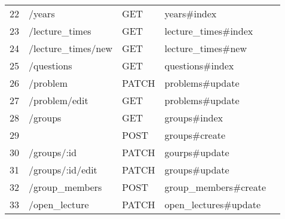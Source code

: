 \begin{table}[]
\begin{tabular}{lllll}
\multicolumn{1}{|l|}{22}  & \multicolumn{1}{l|}{/years}              & \multicolumn{1}{l|}{GET}    & \multicolumn{1}{l|}{years\#index}             &  \\ \cline{1-4}
\multicolumn{1}{|l|}{23}  & \multicolumn{1}{l|}{/lecture\_times}     & \multicolumn{1}{l|}{GET}    & \multicolumn{1}{l|}{lecture\_times\#index}    &  \\ \cline{1-4}
\multicolumn{1}{|l|}{24}  & \multicolumn{1}{l|}{/lecture\_times/new} & \multicolumn{1}{l|}{GET}    & \multicolumn{1}{l|}{lecture\_times\#new}      &  \\ \cline{1-4}
\multicolumn{1}{|l|}{25}  & \multicolumn{1}{l|}{/questions}          & \multicolumn{1}{l|}{GET}    & \multicolumn{1}{l|}{questions\#index}         &  \\ \cline{1-4}
\multicolumn{1}{|l|}{26}  & \multicolumn{1}{l|}{/problem}            & \multicolumn{1}{l|}{PATCH}  & \multicolumn{1}{l|}{problems\#update}         &  \\ \cline{1-4}
\multicolumn{1}{|l|}{27}  & \multicolumn{1}{l|}{/problem/edit}       & \multicolumn{1}{l|}{GET}    & \multicolumn{1}{l|}{problems\#update}         &  \\ \cline{1-4}
\multicolumn{1}{|l|}{28}  & \multicolumn{1}{l|}{/groups}             & \multicolumn{1}{l|}{GET}    & \multicolumn{1}{l|}{groups\#index}            &  \\ \cline{1-4}
\multicolumn{1}{|l|}{29}  & \multicolumn{1}{l|}{}                    & \multicolumn{1}{l|}{POST}   & \multicolumn{1}{l|}{groups\#create}           &  \\ \cline{1-4}
\multicolumn{1}{|l|}{30}  & \multicolumn{1}{l|}{/groups/:id}         & \multicolumn{1}{l|}{PATCH}  & \multicolumn{1}{l|}{gourps\#update}           &  \\ \cline{1-4}
\multicolumn{1}{|l|}{31}  & \multicolumn{1}{l|}{/groups/:id/edit}    & \multicolumn{1}{l|}{PATCH}  & \multicolumn{1}{l|}{groups\#update}           &  \\ \cline{1-4}
\multicolumn{1}{|l|}{32}  & \multicolumn{1}{l|}{/group\_members}     & \multicolumn{1}{l|}{POST}   & \multicolumn{1}{l|}{group\_members\#create}   &  \\ \cline{1-4}
\multicolumn{1}{|l|}{33}  & \multicolumn{1}{l|}{/open\_lecture}      & \multicolumn{1}{l|}{PATCH}  & \multicolumn{1}{l|}{open\_lectures\#update}   &  \\ \cline{1-4}
\end{tabular}
\end{table}




